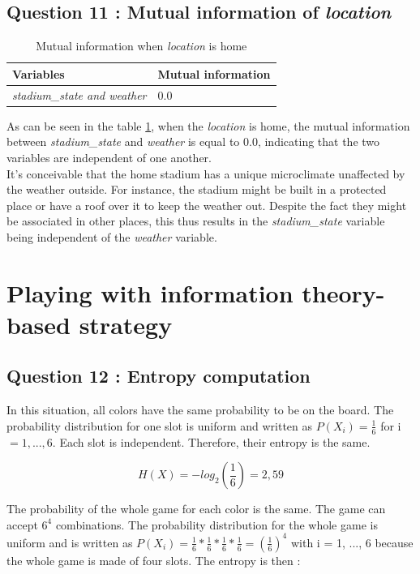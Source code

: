 \documentclass[titlepage]{article}
\begin{document}
\subsection*{Question 11 : Mutual information of \textit{location}}

\begin{table}[h!]
    \centering
    \small
    \setlength{\tabcolsep}{4pt}
    \begin{tabular}{|p{4cm}|p{4cm}|}
        \hline 
        \textbf{Variables} & \textbf{Mutual information}\\
        \hline
        \textit{stadium\_state and weather} & 0.0\\
        \hline
    \end{tabular}
    \caption{Mutual information when \textit{location} is home}
    \label{tab:q11}
\end{table}

As can be seen in the table \ref{tab:q11}, when the \textit{location} is home, the mutual information between \textit{stadium\_state} and \textit{weather} is equal to 0.0, indicating that the two variables are independent of one another.\\

It's conceivable that the home stadium has a unique microclimate unaffected by the weather outside. For instance, the stadium might be built in a protected place or have a roof over it to keep the weather out. Despite the fact they might be associated in other places, this thus results in the \textit{stadium\_state} variable being independent of the \textit{weather} variable.

\section{Playing with information theory-based strategy}

\subsection*{Question 12 : Entropy computation}

In this situation, all colors have the same probability to be on the board. The probability distribution for one slot is uniform and written as $P(X_i) = \frac{1}{6}$ for i $= 1,...,6$. Each slot is independent. Therefore, their entropy is the same. 

$$ H(X) = - log_2\left(\frac{1}{6}\right) = 2,59$$

The probability of the whole game for each color is the same. The game can accept $6^4$ combinations. The probability distribution for the whole game is uniform and is written as $P(X_i) = \frac{1}{6} * \frac{1}{6} * \frac{1}{6} * \frac{1}{6} = (\frac{1}{6})^4$ with i = 1, ..., 6  because the whole game is made of four slots. The entropy is then : 
\end{document}
